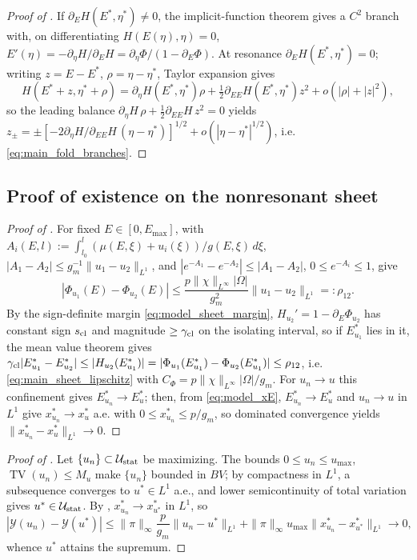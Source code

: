 \documentclass[a4paper,fleqn,longmktitle]{cas-sc}
\theoremstyle{plain}
\theoremstyle{definition}
\theoremstyle{remark}
\numberwithin{equation}{section}
\begin{document}
\begin{proof}[Proof of ]
If \(\partial_EH(E^*,\eta^*)\ne0\), the implicit-function theorem gives a
\(C^2\) branch with, on differentiating \(H(E(\eta),\eta)=0\),
\(E'(\eta)=-\partial_\eta H/\partial_EH=\partial_\eta\Phi/(1-\partial_E\Phi)\).
At resonance \(\partial_EH(E^*,\eta^*)=0\); writing \(z=E-E^*\),
\(\rho=\eta-\eta^*\), Taylor expansion gives
\[
    H(E^*+z,\eta^*+\rho)
    =
    \partial_\eta H(E^*,\eta^*)\rho
    +
    \tfrac12\partial_{EE}H(E^*,\eta^*)z^2
    +
    o(|\rho|+|z|^2),
\]
so the leading balance \(\partial_\eta H\,\rho+\tfrac12\partial_{EE}H\,z^2=0\)
yields \(z_\pm=\pm[-2\partial_\eta H/\partial_{EE}H\,(\eta-\eta^*)]^{1/2}
+o(|\eta-\eta^*|^{1/2})\), i.e. \eqref{eq:main_fold_branches}.
\end{proof}
\subsection{Proof of existence on the nonresonant sheet}
\label{subsec:proof_existence}
\begin{proof}[Proof of ]
For fixed \(E\in[0,E_{\max}]\), with
\(A_i(E,l):=\int_{l_0}^l(\mu(E,\xi)+u_i(\xi))/g(E,\xi)\,d\xi\),
\(|A_1-A_2|\le g_m^{-1}\|u_1-u_2\|_{L^1}\), and \(|e^{-A_1}-e^{-A_2}|\le|A_1-A_2|\),
\(0\le e^{-A_i}\le1\), give
\[
    |\Phi_{u_1}(E)-\Phi_{u_2}(E)|
    \le
    \frac{p\|\chi\|_{L^\infty}|\Omega|}{g_m^2}\|u_1-u_2\|_{L^1}
    =:\rho_{12}.
\]
By the sign-definite margin \eqref{eq:model_sheet_margin},
\(H_{u_2}'=1-\partial_E\Phi_{u_2}\) has constant sign \(s_{\rm cl}\) and
magnitude \(\ge\gamma_{\rm cl}\) on the isolating interval, so if \(E_{u_1}^*\)
lies in it, the mean value theorem gives
\(\gamma_{\rm cl}|E_{u_1}^*-E_{u_2}^*|\le|H_{u_2}(E_{u_1}^*)|
=|\Phi_{u_1}(E_{u_1}^*)-\Phi_{u_2}(E_{u_1}^*)|\le\rho_{12}\), i.e.
\eqref{eq:main_sheet_lipschitz} with \(C_\Phi=p\|\chi\|_{L^\infty}|\Omega|/g_m\).
For \(u_n\to u\) this confinement gives \(E_{u_n}^*\to E_u^*\); then, from
\eqref{eq:model_xE}, \(E_{u_n}^*\to E_u^*\) and \(u_n\to u\) in \(L^1\) give
\(x_{u_n}^*\to x_u^*\) a.e. with \(0\le x_{u_n}^*\le p/g_m\), so dominated
convergence yields \(\|x_{u_n}^*-x_u^*\|_{L^1}\to0\).
\end{proof}
\begin{proof}[Proof of ]
Let \(\{u_n\}\subset\mathcal U_{\rm stat}\) be maximizing. The bounds
\(0\le u_n\le u_{\max}\), \(\operatorname{TV}(u_n)\le M_u\) make \(\{u_n\}\)
bounded in \(BV\); by compactness in \(L^1\), a subsequence converges to
\(u^*\in L^1\) a.e., and lower semicontinuity of total variation gives
\(u^*\in\mathcal U_{\rm stat}\). By ,
\(x_{u_n}^*\to x_{u^*}^*\) in \(L^1\), so
\[
    |\mathcal Y(u_n)-\mathcal Y(u^*)|
    \le
    \|\pi\|_\infty\frac{p}{g_m}\|u_n-u^*\|_{L^1}
    +
    \|\pi\|_\infty u_{\max}\|x_{u_n}^*-x_{u^*}^*\|_{L^1}
    \to0,
\]
whence \(u^*\) attains the supremum.
\end{proof}
\end{document}
